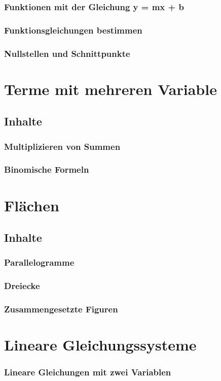 \documentclass{article}
\begin{document}
\subsubsection*{Funktionen mit der Gleichung y = mx + b}
\subsubsection*{Funktionsgleichungen bestimmen}
\subsubsection*{Nullstellen und Schnittpunkte}
\newpage
\section{Terme mit mehreren Variable}
\subsection{Inhalte}
\subsubsection*{Multiplizieren von Summen}
\subsubsection*{Binomische Formeln}
\newpage
\section{Flächen}
\subsection{Inhalte}
\subsubsection*{Parallelogramme}
\subsubsection*{Dreiecke}
\subsubsection*{Zusammengesetzte Figuren}
\newpage
\section{Lineare Gleichungssysteme}
\subsubsection*{Lineare Gleichungen mit zwei Variablen}
\end{document}
